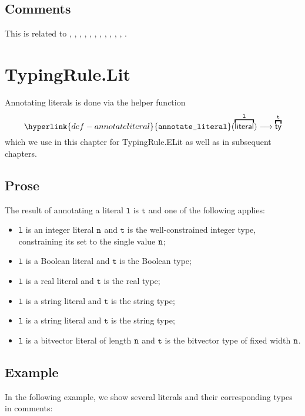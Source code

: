 \documentclass{book}
\newcommand\annotateliteral[1]{\hyperlink{def-annotateliteral}{\texttt{annotate\_literal}}(#1)}
\newcommand\vl[0]{\texttt{l}}
\newcommand\vt[0]{\texttt{t}}
\begin{document}
\subsection{Comments}
  This is related to , , , ,
  , , , , ,
  , , .

\hypertarget{def-annotateliteral}{}
\section{TypingRule.Lit \label{sec:TypingRule.Lit}}

Annotating literals is done via the helper function
\[
  \annotateliteral{\overname{\literal}{\vl}} \aslto \overname{\ty}{\vt}
\]
which we use in this chapter for TypingRule.ELit as well as in subsequent chapters.
\subsection{Prose}
The result of annotating a literal $\vl$ is $\vt$ and one of the following applies:
\begin{itemize}
\item $\vl$ is an integer literal $\texttt{n}$ and $\vt$ is the well-constrained integer type, constraining
its set to the single value $\texttt{n}$;
\item $\vl$ is a Boolean literal and $\vt$ is the Boolean type;
\item $\vl$ is a real literal and $\vt$ is the real type;
\item $\vl$ is a string literal and $\vt$ is the string type;
\item $\vl$ is a string literal and $\vt$ is the string type;
\item $\vl$ is a bitvector literal of length $\texttt{n}$ and $\vt$ is the bitvector type of fixed width $\texttt{n}$.
\end{itemize}

\subsection{Example}
In the following example, we show several literals and their corresponding types in comments:

\end{document}
